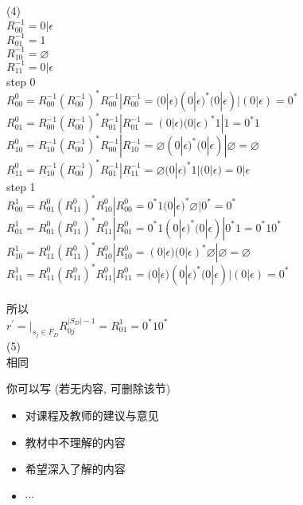 \documentclass[a4paper, justified]{tufte-handout}
\begin{document}
\begin{solution}
    \noindent(4)\\
     \indent$R_{00}^{-1}=0|\epsilon$\\
    \indent$R_{01}^{-1}=1$\\
    \indent$R_{10}^{-1}=\varnothing$\\
    \indent$R_{11}^{-1}=0|\epsilon$\\
    
    \indent step 0\\
    \indent$R_{00}^{0}=R_{00}^{-1}(R_{00}^{-1})^*R_{00}^{-1}|R_{00}^{-1}=(0|\epsilon)(0|\epsilon)^*(0|\epsilon)|(0|\epsilon)=0^*$\\
    \indent$R_{01}^{0}=R_{00}^{-1}(R_{00}^{-1})^*R_{01}^{-1}|R_{01}^{-1}=(0|\epsilon)(0|\epsilon)^*1|1=0^*1$\\
    \indent$R_{10}^{0}=R_{10}^{-1}(R_{00}^{-1})^*R_{00}^{-1}|R_{10}^{-1}=\varnothing(0|\epsilon)^*(0|\epsilon)|\varnothing=\varnothing$\\
    \indent$R_{11}^{0}=R_{10}^{-1}(R_{00}^{-1})^*R_{01}^{-1}|R_{11}^{-1}=\varnothing(0|\epsilon)^*1|(0|\epsilon)=0|\epsilon$\\
    
    \indent step 1\\
    \indent$R_{00}^{1}=R_{01}^{0}(R_{11}^{0})^*R_{10}^{0}|R_{00}^{0}=0^*1(0|\epsilon)^*\varnothing|0^*=0^*$\\
    \indent$R_{01}^{1}=R_{01}^{0}(R_{11}^{0})^*R_{11}^{0}|R_{01}^{0}=0^*1(0|\epsilon)^*(0|\epsilon)|0^*1=0^*10^*$\\
    \indent$R_{10}^{1}=R_{11}^{0}(R_{11}^{0})^*R_{10}^{0}|R_{10}^{0}=(0|\epsilon)(0|\epsilon)^*\varnothing|\varnothing=\varnothing$\\
    \indent$R_{11}^{1}=R_{11}^{0}(R_{11}^{0})^*R_{11}^{0}|R_{11}^{0}=(0|\epsilon)(0|\epsilon)^*(0|\epsilon)|(0|\epsilon)=0^*$\\\\
    \indent 所以\\
    \indent$r^{'}=|_{s_j\in{F_D}}R_{0j}^{|S_D|-1}=R_{01}^{1}=0^*10^*$\\
    
    \noindent(5)\\
    相同
    
    
\end{solution}



\beginfb

你可以写 (若无内容, 可删除该节)
\begin{itemize}
  \item 对课程及教师的建议与意见
  \item 教材中不理解的内容
  \item 希望深入了解的内容
  \item $\cdots$
\end{itemize}
\end{document}
